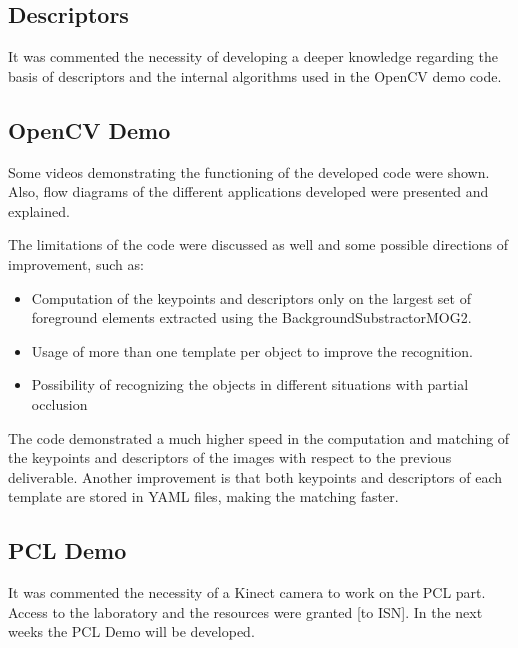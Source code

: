 \documentclass{article}
\newenvironment{myindentpar}[1]%
 {\begin{list}{}%
         {\setlength{\leftmargin}{#1}}%
         \item[]%
 }
 {\end{list}}
\begin{document}
	\subsection{Descriptors }
		\begin{myindentpar}{1cm} 
		It was commented the necessity of developing a deeper knowledge regarding the basis of descriptors and the internal algorithms used in the OpenCV demo code. 
		\end{myindentpar}
		
	\subsection{OpenCV Demo}
		\begin{myindentpar}{1cm} 
		Some videos demonstrating the functioning of the developed code were shown. Also, flow diagrams of the different applications developed were presented and explained.
		
		 The limitations of the code were discussed as well and some possible directions of improvement, such as:
		\begin{itemize}
			\item{Computation of the keypoints and descriptors only on the largest set of foreground elements extracted using the BackgroundSubstractorMOG2.}
			\item{Usage of more than one template per object to improve the recognition.}
			\item{Possibility of recognizing the objects in different situations with partial occlusion}
		\end{itemize}
		
		The code demonstrated a much higher speed in the computation and matching of the keypoints and descriptors of the images with respect to the previous deliverable. Another improvement is that both keypoints and descriptors of each template are stored in YAML files, making the matching faster.
		\end{myindentpar}
	
	\subsection{PCL Demo}
		\begin{myindentpar}{1cm}
		It was commented the necessity of a Kinect camera to work on the PCL part. Access to the laboratory and the resources were granted [to ISN]. In the next weeks the PCL Demo will be developed. 
		\end{myindentpar}
\end{document}
